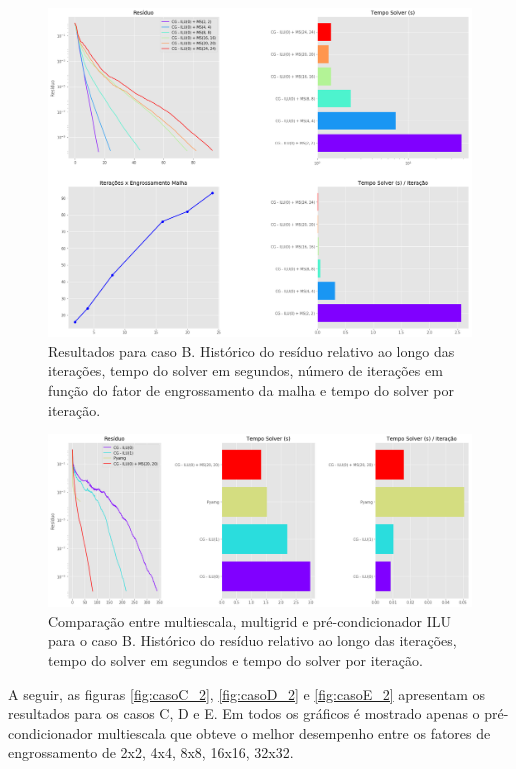 \begin{figure}[!htbp]
\label{fig:reservatorio320x320_1}
\centering
\includegraphics[width=\textwidth]{chap08/figs/reservatorio320x320_1.png}
\caption{Resultados para caso B. Histórico do resíduo relativo ao longo das iterações, tempo do solver em segundos, número de iterações em função do fator de engrossamento da malha e tempo do solver por iteração. }
\end{figure}


\begin{figure}[!htbp]
\label{fig:reservatorio320x320_2}
\centering
\includegraphics[width=\textwidth]{chap08/figs/reservatorio320x320_2.png}
\caption{Comparação entre multiescala, multigrid e pré-condicionador ILU para o caso B. Histórico do resíduo relativo ao longo das iterações, tempo do solver em segundos e tempo do solver por iteração. }
\end{figure}


A seguir, as figuras \ref{fig:casoC_2}, \ref{fig:casoD_2} e \ref{fig:casoE_2} apresentam os resultados para os casos C, D e E. Em todos os gráficos é mostrado apenas o pré-condicionador multiescala que obteve o melhor desempenho entre os fatores de engrossamento de 2x2, 4x4, 8x8, 16x16, 32x32.


